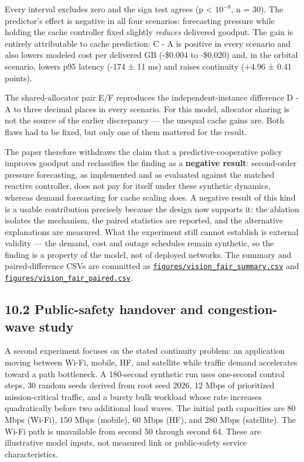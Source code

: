 \documentclass[
  american,
  11pt,
]{article}
\begin{document}
Every interval excludes zero and the sign test agrees (p \textless{}
\(10^{-8}\), n = 30). The predictor's effect is negative in all four
scenarios: forecasting pressure while holding the cache controller fixed
slightly \emph{reduces} delivered goodput. The gain is entirely
attributable to cache prediction: C - A is positive in every scenario
and also lowers modeled cost per delivered GB (-\$0.004 to -\$0.020)
and, in the orbital scenario, lowers p95 latency (-174 ± 11 ms) and
raises continuity (+4.96 ± 0.41 points).

The shared-allocator pair E/F reproduces the independent-instance
difference D - A to three decimal places in every scenario. For this
model, allocator sharing is not the source of the earlier discrepancy
--- the unequal cache gains are. Both flaws had to be fixed, but only
one of them mattered for the result.

The paper therefore withdraws the claim that a predictive-cooperative
policy improves goodput and reclassifies the finding as a
\textbf{negative result}: second-order pressure forecasting, as
implemented and as evaluated against the matched reactive controller,
does not pay for itself under these synthetic dynamics, whereas demand
forecasting for cache scaling does. A negative result of this kind is a
usable contribution precisely because the design now supports it: the
ablation isolates the mechanism, the paired statistics are reported, and
the alternative explanations are measured. What the experiment still
cannot establish is external validity --- the demand, cost and outage
schedules remain synthetic, so the finding is a property of the model,
not of deployed networks. The summary and paired-difference CSVs are
committed as
\href{../figures/vision_fair_summary.csv}{\texttt{figures/vision\_fair\_summary.csv}}
and
\href{../figures/vision_fair_paired.csv}{\texttt{figures/vision\_fair\_paired.csv}}.

\subsection{10.2 Public-safety handover and congestion-wave
study}\label{public-safety-handover-and-congestion-wave-study}

A second experiment focuses on the stated continuity problem: an
application moving between Wi-Fi, mobile, HF, and satellite while
traffic demand accelerates toward a path bottleneck. A 180-second
synthetic run uses one-second control steps, 30 random seeds derived
from root seed 2026, 12 Mbps of prioritized mission-critical traffic,
and a bursty bulk workload whose rate increases quadratically before two
additional load waves. The initial path capacities are 80 Mbps (Wi-Fi),
150 Mbps (mobile), 60 Mbps (HF), and 280 Mbps (satellite). The Wi-Fi
path is unavailable from second 50 through second 64. These are
illustrative model inputs, not measured link or public-safety service
characteristics.
\end{document}
